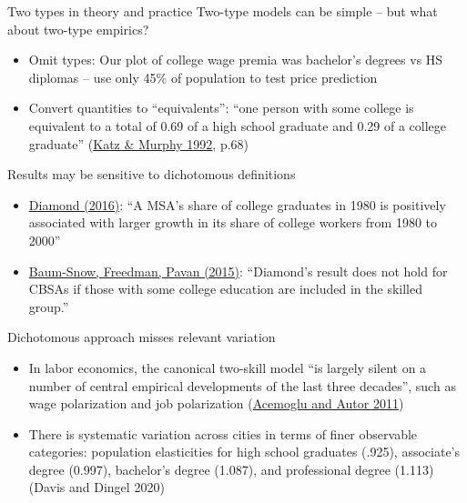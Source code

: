 \documentclass[10pt,notes=hide]{beamer}
\begin{document}
\begin{frame}{Two types in theory and practice}
Two-type models can be simple -- but what about two-type empirics?
\begin{itemize}
	\item Omit types: Our plot of college wage premia was bachelor's degrees vs HS diplomas -- use only 45\% of population to test price prediction
	\item Convert quantities to ``equivalents'': ``one person with some college is equivalent to a total of 0.69 of a high school graduate and 0.29 of a college graduate'' (\href{http://www.jstor.org/stable/2118323}{Katz \& Murphy 1992}, p.68)
\end{itemize}
\pause Results may be sensitive to dichotomous definitions
\begin{itemize}
	\item \href{https://www.aeaweb.org/articles?id=10.1257/aer.20131706}{Diamond (2016)}: ``A MSA's share of college graduates in 1980 is positively associated with larger growth in its share of college workers from 1980 to 2000''
	\item \href{https://www.aeaweb.org/articles?id=10.1257/app.20160510}{Baum-Snow, Freedman, Pavan (2015)}: ``Diamond's result does not hold for CBSAs if those with some college education are included in the skilled group.''
\end{itemize}
\end{frame}
\begin{frame}{Dichotomous approach misses relevant variation}
\begin{itemize}
	\item In labor economics, the canonical two-skill model ``is largely silent on a number of central empirical developments of the last three decades'', such as wage polarization and job polarization (\href{http://www.sciencedirect.com/science/article/pii/S0169721811024105}{Acemoglu and Autor 2011})
	\item There is systematic variation across cities in terms of finer observable categories: population elasticities for high school graduates (.925), associate's degree (0.997), bachelor's degree (1.087), and professional degree (1.113) (Davis and Dingel 2020)
\end{itemize}
\end{frame}
\end{document}
